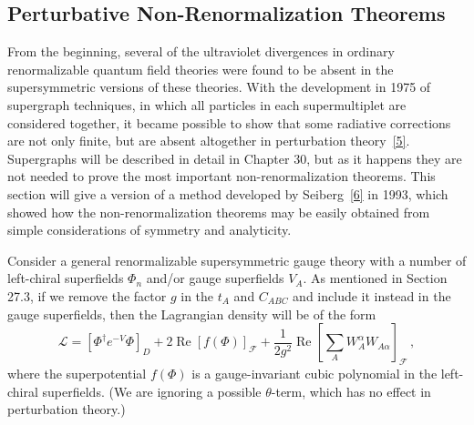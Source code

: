 
\subsection{Perturbative Non-Renormalization Theorems}

From the beginning, several of the ultraviolet divergences in ordinary
renormalizable quantum field theories were found to be absent in the
supersymmetric versions of these theories. With the development in 1975 of
supergraph techniques, in which all particles in each supermultiplet are
considered together, it became possible to show that some radiative
corrections are not only finite, but are absent altogether in perturbation
theory~\hyperref[ch27-ref-5]{[5]}. Supergraphs will be described in detail in
Chapter 30, but as it happens they are not needed to prove the most important
non-renormalization theorems. This section will give a version of a method
developed by Seiberg~\hyperref[ch27-ref-6]{[6]} in 1993, which showed how the
non-renormalization theorems may be easily obtained from simple
considerations of symmetry and analyticity.

Consider a general renormalizable supersymmetric gauge theory with a number
of left-chiral superfields \(\Phi_n\) and/or gauge superfields \(V_A\). As
mentioned in Section 27.3, if we remove the factor \(g\) in the \(t_A\) and
\(C_{ABC}\) and include it instead in the gauge superfields, then the
Lagrangian density will be of the form
\begin{equation}
  \mathcal{L}
  =
  \left[\Phi^\dagger e^{-V}\Phi\right]_D
  +2\operatorname{Re}\left[f(\Phi)\right]_{\mathcal{F}}
  +\frac{1}{2g^2}\operatorname{Re}
  \left[
    \sum_A W_A^\alpha W_{A\alpha}
  \right]_{\mathcal{F}}\,,
  \tag{27.6.1}\label{eq:27.6.1}
\end{equation}
where the superpotential \(f(\Phi)\) is a gauge-invariant cubic polynomial in
the left-chiral superfields. (We are ignoring a possible \(\theta\)-term,
which has no effect in perturbation theory.)

